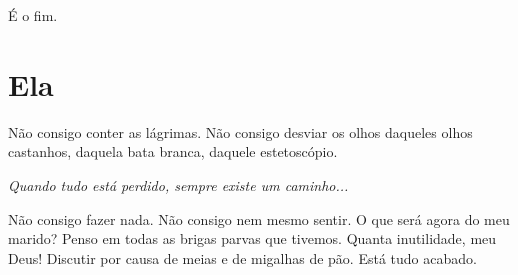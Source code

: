 \documentclass{creativeWriting}
\begin{document}
 É o fim.

\section{Ela}

Não consigo conter as lágrimas. Não consigo desviar os olhos daqueles olhos castanhos, daquela bata branca, daquele estetoscópio.

\textit{Quando tudo está perdido, sempre existe um caminho...}

Não consigo fazer nada. Não consigo nem mesmo sentir. O que será agora do meu marido? Penso em todas as brigas parvas que tivemos. Quanta inutilidade, meu Deus! Discutir por causa de meias e de migalhas de pão. Está tudo acabado. 
\end{document}
